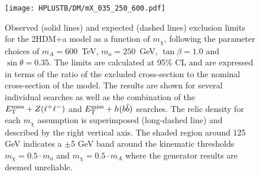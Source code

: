 \begin{figure}[htb]
    \RawFloats
    \centering
    \texttt{[image: HPLUSTB/DM/mX\_035\_250\_600.pdf]}
    \caption{Observed (solid lines) and expected (dashed lines) exclusion limits for the 2HDM+a model as a function of $m_\chi$, following the parameter choices of $m_A = 600$~TeV, $m_a = 250$~GeV, $\tan\beta= 1.0$ and $\sin\theta=0.35$. The limits are calculated at 95\% CL and are expressed in terms of the ratio of the excluded cross-section to the nominal cross-section of the model. The results are shown for several individual searches as well as the combination of the $E_{\text{T}}^{\text{miss}}+Z(\ell^+\ell^-)$ and $E_{\text{T}}^{\text{miss}}+h(b\bar{b})$ searches. The relic density for each $m_\chi$ assumption is superimposed (long-dashed line) and described by the right vertical axis. The shaded region around 125 GeV indicates a $\pm$5 GeV band around the kinematic thresholds $m_\chi= 0.5 \cdot m_a$ and $m_\chi = 0.5 \cdot m_A$ where the generator
    results are deemed unreliable.}
    \label{Hplustb:2HDMa_mchi}
\end{figure}







